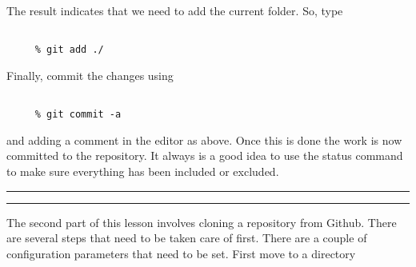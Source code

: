 \documentclass[10pt,fleqn]{article}
\begin{document}
The result indicates that we need to add the current folder. So, type
\begin{verbatim}

     % git add ./

\end{verbatim}
Finally, commit the changes using
\begin{verbatim}

     % git commit -a

\end{verbatim}
and adding a comment in the editor as above. Once this is done the work is now
committed to the repository. It always is a good idea to use the status command
to make sure everything has been included or excluded.
\vskip0.1in\hrule\vskip0.1in
\vskip0.1in\hrule\vskip0.1in
\noindent
The second part of this lesson involves cloning a repository from Github. There
are several steps that need to be taken care of first. There are a couple of
configuration parameters that need to be set. First move to a directory
\end{document}
